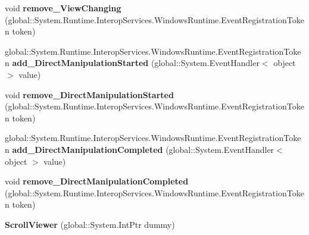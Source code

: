 \begin{DoxyCompactItemize}
\item 
\mbox{\label{class_windows_1_1_u_i_1_1_xaml_1_1_controls_1_1_scroll_viewer_a4ab42f006f295d28bd3080f99f149352}} 
void {\bfseries remove\+\_\+\+View\+Changing} (global\+::\+System.\+Runtime.\+Interop\+Services.\+Windows\+Runtime.\+Event\+Registration\+Token token)
\item 
\mbox{\label{class_windows_1_1_u_i_1_1_xaml_1_1_controls_1_1_scroll_viewer_adab47141d357f03365676f3c0dc8360c}} 
global\+::\+System.\+Runtime.\+Interop\+Services.\+Windows\+Runtime.\+Event\+Registration\+Token {\bfseries add\+\_\+\+Direct\+Manipulation\+Started} (global\+::\+System.\+Event\+Handler$<$ object $>$ value)
\item 
\mbox{\label{class_windows_1_1_u_i_1_1_xaml_1_1_controls_1_1_scroll_viewer_a34f553f86c580da23d4109f5e64d47bc}} 
void {\bfseries remove\+\_\+\+Direct\+Manipulation\+Started} (global\+::\+System.\+Runtime.\+Interop\+Services.\+Windows\+Runtime.\+Event\+Registration\+Token token)
\item 
\mbox{\label{class_windows_1_1_u_i_1_1_xaml_1_1_controls_1_1_scroll_viewer_a5700eed19403dac498a6b0e4c2164043}} 
global\+::\+System.\+Runtime.\+Interop\+Services.\+Windows\+Runtime.\+Event\+Registration\+Token {\bfseries add\+\_\+\+Direct\+Manipulation\+Completed} (global\+::\+System.\+Event\+Handler$<$ object $>$ value)
\item 
\mbox{\label{class_windows_1_1_u_i_1_1_xaml_1_1_controls_1_1_scroll_viewer_abfd26932c4679f145e20ab03785ea8be}} 
void {\bfseries remove\+\_\+\+Direct\+Manipulation\+Completed} (global\+::\+System.\+Runtime.\+Interop\+Services.\+Windows\+Runtime.\+Event\+Registration\+Token token)
\item 
\mbox{\label{class_windows_1_1_u_i_1_1_xaml_1_1_controls_1_1_scroll_viewer_ae43835a1ae5cf186b95dbddb1dec3e35}} 
{\bfseries Scroll\+Viewer} (global\+::\+System.\+Int\+Ptr dummy)
\item 

\end{DoxyCompactItemize}
